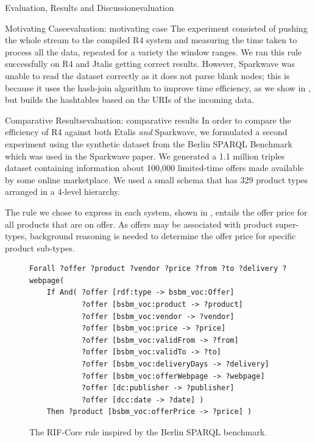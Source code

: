 \begin{nestedsection}{Evaluation, Results and Discussion}{evaluation}
\begin{nestedsection}{Motivating Case}{evaluation: motivating case}
		The experiment consisted of pushing the whole stream to the compiled R4 system and measuring the time taken to process all the data, repeated for a variety the window ranges.
		We ran this rule successfully on R4 and Jtalis getting correct results.
		However, Sparkwave was unable to read the dataset correctly as it does not parse blank nodes;
		this is because it uses the hash-join algorithm to improve time efficiency, as we show in , but builds the hashtables based on the URIs of the incoming data.
	\end{nestedsection}
	\begin{nestedsection}{Comparative Results}{evaluation: comparative results}
		In order to compare the efficiency of R4 against both Etalis \emph{and} Sparkwave, we formulated a second experiment using the synthetic dataset from the Berlin SPARQL Benchmark \citep{BSBMresults} which was used in the Sparkwave paper.
		We generated a 1.1 million triples dataset containing information about 100,000 limited-time offers made available by some online marketplace.
		We used a small schema that has 329 product types arranged in a 4-level hierarchy.

		The rule we chose to express in each system, shown in , entails the offer price for all products that are on offer.
		As offers may be associated with product super-types, background reasoning is needed to determine the offer price for specific product sub-types.
		\begin{figure}
			\centering
			\begin{verbatim}
Forall ?offer ?product ?vendor ?price ?from ?to ?delivery ?webpage(
    If And( ?offer [rdf:type -> bsbm_voc:Offer]
            ?offer [bsbm_voc:product -> ?product]
            ?offer [bsbm_voc:vendor -> ?vendor]
            ?offer [bsbm_voc:price -> ?price]
            ?offer [bsbm_voc:validFrom -> ?from]
            ?offer [bsbm_voc:validTo -> ?to]
            ?offer [bsbm_voc:deliveryDays -> ?delivery]
            ?offer [bsbm_voc:offerWebpage -> ?webpage]
            ?offer [dc:publisher -> ?publisher]
            ?offer [dcc:date -> ?date] )
    Then ?product [bsbm_voc:offerPrice -> ?price] )
			\end{verbatim}
			\caption{The RIF-Core rule inspired by the Berlin SPARQL benchmark.}
		\end{figure}


\end{nestedsection}
\end{nestedsection}
